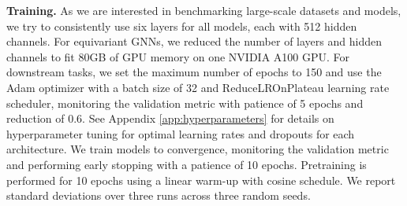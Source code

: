 \textbf{Training. }
As we are interested in benchmarking large-scale datasets and models, we try to consistently use six layers for all models, each with 512 hidden channels. For equivariant GNNs, we reduced the number of layers and hidden channels to fit 80GB of GPU memory on one NVIDIA A100 GPU.
For downstream tasks, we set the maximum number of epochs to 150 and use the Adam optimizer with a batch size of 32 and ReduceLROnPlateau learning rate scheduler, monitoring the validation metric with patience of 5 epochs and reduction of 0.6. 
See Appendix \ref{app:hyperparameters} for details on hyperparameter tuning for optimal learning rates and dropouts for each architecture.
We train models to convergence, monitoring the validation metric and performing early stopping with a patience of 10 epochs.
Pretraining is performed for 10 epochs using a linear warm-up with cosine schedule. 
We report standard deviations over three runs across three random seeds.